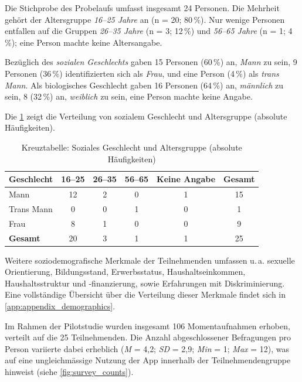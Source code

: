 Die Stichprobe des Probelaufs umfasst insgesamt 24 Personen. Die Mehrheit gehört der Altersgruppe \emph{16--25 Jahre} an (n = 20; 80\,\%). Nur wenige Personen entfallen auf die Gruppen \emph{26--35 Jahre} (n = 3; 12\,\%) und \emph{56--65 Jahre} (n = 1; 4\,\%); eine Person machte keine Altersangabe.

Bezüglich des \emph{sozialen Geschlechts} gaben 15 Personen (60\,\%) an, \emph{Mann} zu sein, 9 Personen (36\,\%) identifizierten sich als \emph{Frau}, und eine Person (4\,\%) als \emph{trans Mann}. Als biologisches Geschlecht gaben 16 Personen (64\,\%) an, \emph{männlich} zu sein, 8 (32\,\%) an, \emph{weiblich} zu sein, eine Person machte keine Angabe.

Die \cref{tab:kreuztabelle_abs} zeigt die Verteilung von sozialem Geschlecht und Altersgruppe (absolute Häufigkeiten).

\begin{table}[H]
    \centering
    \caption{Kreuztabelle: Soziales Geschlecht und Altersgruppe (absolute Häufigkeiten)}
    \label{tab:kreuztabelle_abs}
    \begin{tabular}{lccccc}
    \toprule
    \textbf{Geschlecht} & 16--25 & 26--35 & 56--65 & Keine Angabe & Gesamt \\
    \midrule
    Mann       & 12 & 2 & 0 & 1 & 15 \\
    Trans Mann &  0 & 0 & 1 & 0 & 1  \\
    Frau       &  8 & 1 & 0 & 0 & 9  \\
    \midrule
    \textbf{Gesamt} & 20 & 3 & 1 & 1 & 25 \\
    \bottomrule
    \end{tabular}
\end{table}

Weitere soziodemografische Merkmale der Teilnehmenden umfassen u.\,a. sexuelle Orientierung, Bildungsstand, Erwerbsstatus, Haushaltseinkommen, Haushaltsstruktur und -finanzierung, sowie Erfahrungen mit Diskriminierung. Eine vollständige Übersicht über die Verteilung dieser Merkmale findet sich in \cref{app:appendix_demographics}.


Im Rahmen der Pilotstudie wurden insgesamt 106 Momentaufnahmen erhoben, verteilt auf die 25 Teilnehmenden. Die Anzahl abgeschlossener Befragungen pro Person variierte dabei erheblich (\textit{M} = 4{,}2; \textit{SD} = 2{,}9; \textit{Min} = 1; \textit{Max} = 12), was auf eine ungleichmässige Nutzung der App innerhalb der Teilnehmendengruppe hinweist (siehe \cref{fig:survey_counts}).


